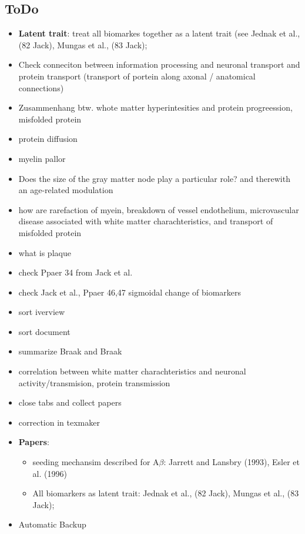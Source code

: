 \documentclass[fleqn]{article}\usepackage{caption}
\begin{document}
\subsection{ToDo}
\begin{itemize}
\item \textbf{Latent trait}: treat all biomarkes together as a latent trait (see Jednak et al., (82 Jack), Mungas et al., (83 Jack); 
\item Check conneciton between information processing and neuronal transport and protein transport (transport of portein along axonal / anatomical connections)
\item Zusammenhang btw. whote matter hyperintesities and protein progreession, misfolded protein
\item protein diffusion
\item myelin pallor
\item Does the size of the gray matter node play a particular role? and therewith an age-related modulation
\item how are rarefaction of myein, breakdown of vessel endothelium, microvascular disease associated with white matter charachteristics, and transport of misfolded protein
\item what is plaque
\item check Ppaer 34 from Jack et al.
\item check Jack et al., Ppaer 46,47 sigmoidal change of biomarkers
\item sort iverview
\item sort document
\item summarize Braak and Braak
\item correlation between white matter charachteristics and neuronal activity/transmision, protein transmission
\item close tabs and collect papers
\item correction in texmaker
\item \textbf{Papers}:
\begin{itemize}
\item seeding mechansim described for A$\beta$: Jarrett and Lansbry (1993), Esler et al. (1996)
\item All biomarkers as latent trait: Jednak et al., (82 Jack), Mungas et al., (83 Jack);
\end{itemize}
\item Automatic Backup
\end{itemize}
\end{document}
